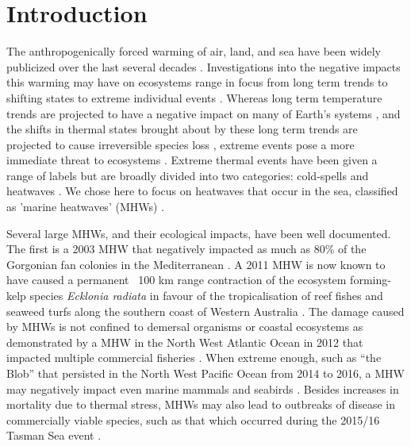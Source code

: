 \documentclass[a4paper,10pt,review]{elsarticle}
\begin{document}
\section{Introduction}
The anthropogenically forced warming of air, land, and sea have been widely publicized over the last several decades \citep[e.g.][]{Manabe1967, Sawyer1972, Hansen1981, Cox2000, Rosenzweig2008}. Investigations into the negative impacts this warming may have on ecosystems range in focus from long term trends \citep[e.g.][]{Scavia2002, Walther2002, Burrows2011} to shifting states \citep[e.g.][]{Travis2003, Grebmeier2006, Blamey2015} to extreme individual events \citep[e.g.][]{Easterling2000, Barrett2008, Wernberg2012a}. Whereas long term temperature trends are projected to have a negative impact on many of Earth's systems \citep{IPCC2014}, and the shifts in thermal states brought about by these long term trends are projected to cause irreversible species loss \citep{Thomas2004}, extreme events pose a more immediate threat to ecosystems \citep[e.g.][]{Jolly2005, Denny2009, Hufkens2012}. Extreme thermal events have been given a range of labels but are broadly divided into two categories: cold-spells \citep[e.g.][]{Gunter1941, Lirman2011, Boucek2016} and heatwaves \citep[e.g.][]{Gordon1988, Stott2004, Perkins-Kirkpatrick2016}. We chose here to focus on heatwaves that occur in the sea, classified as 'marine heatwaves' (MHWs) \citep{Hobday2016}.

Several large MHWs, and their ecological impacts, have been well documented. The first is a 2003 MHW that negatively impacted as much as 80\% of the Gorgonian fan colonies in the Mediterranean \citep{Garrabou2009}. A 2011 MHW is now known to have caused a permanent ~100 km range contraction of the ecosystem forming-kelp species \emph{Ecklonia radiata} in favour of the tropicalisation of reef fishes and seaweed turfs along the southern coast of Western Australia \citep{Wernberg2016}. The damage caused by MHWs is not confined to demersal organisms or coastal ecosystems as demonstrated by a MHW in the North West Atlantic Ocean in 2012 that impacted multiple commercial fisheries \citep{Mills2013}. When extreme enough, such as ``the Blob'' that persisted in the North West Pacific Ocean from 2014 to 2016, a MHW may negatively impact even marine mammals and seabirds \citep{Cavole2016}. Besides increases in mortality due to thermal stress, MHWs may also lead to outbreaks of disease in commercially viable species, such as that which occurred during the 2015/16 Tasman Sea event \citep{Oliver2017}.
\end{document}
